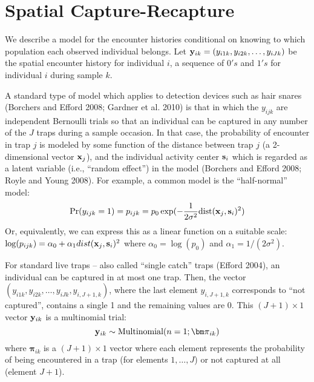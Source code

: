 \begin{comment}
In this model, to implement it, we can have our da variables z[i] but
then we have to split each real guy into the 2 groups. To do that we
have g[i] a cateogrical individual effect which has probabilitys
pi[1] = lambda[1]/(lambda[1]+lambda[2])... where is this going?



So the idea is that we work with the binomial model doing a 
``data augmenation on the total'' instead of data augmenting each
population by itself. 

In this case then , in the general case, the Ng are, conditional on
Ntotal, multinomial with probabilities pi(g) = lambda(g)/sum lambda(g).
\end{comment}


\section{Spatial Capture-Recapture}



We describe a model for the encounter histories conditional on knowing to 
which population each observed individual belongs.  Let ${\bf y}_{ik} =
(y_{i1k},y_{i2k},\ldots,y_{iJk})$ be the spatial encounter history for
individual $i$, a sequence of $0's$ and $1's$ for individual $i$
during sample $k$.  

A standard type of model which applies to detection devices such as
hair snares (Borchers and Efford 2008; Gardner et al. 2010) is that in
which the $y_{ijk}$ are independent Bernoulli trials so that an
individual can be captured in any number of the $J$ traps during a
sample occasion.  In that case, the probability of encounter in trap
$j$ is modeled by some function of the distance between trap $j$ (a
2-dimensional vector
${\bf x}_{j}$),  and
the individual activity center ${\bf s}_{i}$ which is regarded as a
latent variable (i.e., ``random effect'') in the model (Borchers and
Efford 2008; Royle and Young 2008). For example, a common model is the
``half-normal'' model:
\[
\Pr(y_{ijk}  = 1) =
p_{ijk} = 
 p_{0} \exp( -\frac{1}{2\sigma^{2}} 
\mbox{dist}({\bf  x}_{j},{\bf s}_{i})^2 )
\]
Or, equivalently,  we can express this as a linear function on a suitable scale:
$\log(p_{ijk}) = \alpha_{0} + \alpha_{1}dist({\bf  x}_{j},{\bf
   s}_{i})^2$
where $\alpha_{0} = \log(p_{0})$ and $\alpha_{1}= 1/(2\sigma^2)$.

For standard live traps -- also called ``single catch'' traps (Efford
2004), an individual can be captured in at most one trap. Then, the
vector $(y_{i1k},y_{i2k},\ldots,y_{iJk},y_{i,J+1,k})$, where the last
element $y_{i,J+1,k}$ corresponds to ``not captured'', contains a
single 1 and the remaining values are 0.  This $(J+1)\times 1$ vector
${\bf y}_{ik}$ is a multinomial trial:
\[
{\bf y}_{ik} \sim \mbox{Multinomial}(n=1; {\bm \pi}_{ik} )
\]
where ${\bm \pi}_{ik}$ is a $(J+1) \times 1$ vector where each element
represents the probability of being encountered in a trap (for
elements $1,\ldots,J$) or not captured at all (element $J+1$).

